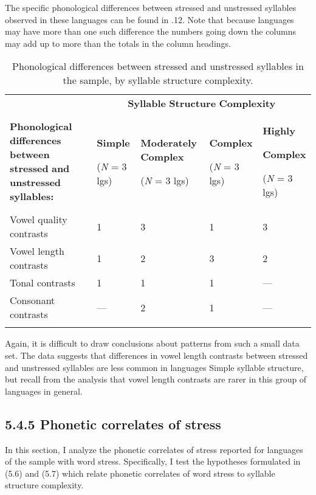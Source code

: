   The specific phonological differences between stressed and unstressed syllables observed in these languages can be found in .12. Note that because languages may have more than one such difference the numbers going down the columns may add up to more than the totals in the column headings.

\begin{table}
\begin{tabularx}{\textwidth}{XXXXX}
\lsptoprule
 & \multicolumn{4}{c}{ \textbf{Syllable} \textbf{Structure} \textbf{Complexity}}\\
 \textbf{Phonological} \textbf{differences} \textbf{between} \textbf{stressed} \textbf{and} \textbf{unstressed} \textbf{syllables:} & { \textbf{Simple}}

 (\textit{N} = 3 lgs) & { \textbf{Moderately} \textbf{Complex}}

 (\textit{N} = 3 lgs) & { \textbf{Complex}}

 (\textit{N} = 3 lgs) & { \textbf{Highly} }

{ \textbf{Complex}}

 (\textit{N} = 3 lgs)\\
 Vowel quality contrasts & 1 & 3 & 1 & 3\\
 Vowel length contrasts & 1 & 2 & 3 & 2\\
 Tonal contrasts & 1 & 1 & 1 & —\\
 Consonant contrasts & — & 2 & 1 & —\\
\lspbottomrule
\end{tabularx}
\caption{\label{5.12}Phonological differences between stressed and unstressed syllables in the sample, by syllable structure complexity.}
\end{table}

  Again, it is difficult to draw conclusions about patterns from such a small data set. The data suggests that differences in vowel length contrasts between stressed and unstressed syllables are less common in languages Simple syllable structure, but recall from the analysis  that vowel length contrasts are rarer in this group of languages in general.

\subsection{5.4.5 Phonetic correlates of stress}

  In this section, I analyze the phonetic correlates of stress reported for languages of the sample with word stress. Specifically, I test the hypotheses formulated in (5.6) and (5.7) which relate phonetic correlates of word stress to syllable structure complexity.


